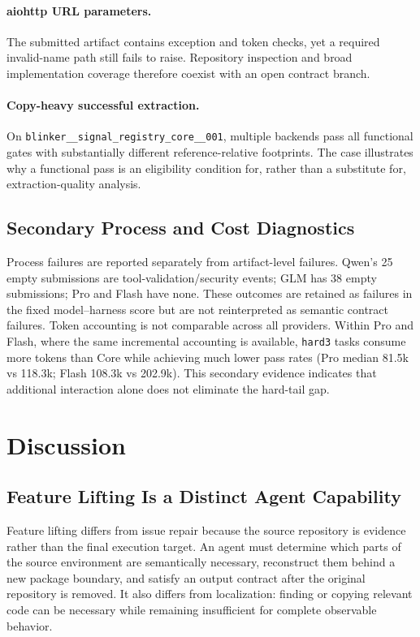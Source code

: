 \documentclass[acmsmall,screen,review,anonymous]{acmart}
\begin{document}
\paragraph{aiohttp URL parameters.}
The submitted artifact contains exception and token checks, yet a required
invalid-name path still fails to raise. Repository inspection and broad
implementation coverage therefore coexist with an open contract branch.

\paragraph{Copy-heavy successful extraction.}
On \texttt{blinker\_\_signal\_registry\_core\_\_001}, multiple backends pass
all functional gates with substantially different reference-relative footprints.
The case illustrates why a functional pass is an eligibility condition for, rather
than a substitute for, extraction-quality analysis.

\subsection{Secondary Process and Cost Diagnostics}

Process failures are reported separately from artifact-level failures. Qwen's 25
empty submissions are tool-validation/security events; GLM has 38 empty
submissions; Pro and Flash have none. These outcomes are retained as failures in the
fixed model--harness score but are not reinterpreted as semantic contract failures.
Token accounting is not comparable across all providers. Within Pro and Flash,
where the same incremental accounting is available, \texttt{hard3} tasks consume
more tokens than Core while achieving much lower pass rates (Pro median 81.5k vs
118.3k; Flash 108.3k vs 202.9k). This secondary evidence indicates that additional
interaction alone does not eliminate the hard-tail gap.

\section{Discussion}
\label{sec:discussion}

\subsection{Feature Lifting Is a Distinct Agent Capability}

Feature lifting differs from issue repair because the source repository is evidence
rather than the final execution target. An agent must determine which parts of the
source environment are semantically necessary, reconstruct them behind a new
package boundary, and satisfy an output contract after the original repository is
removed. It also differs from localization: finding or copying relevant code can be
necessary while remaining insufficient for complete observable behavior.
\end{document}
